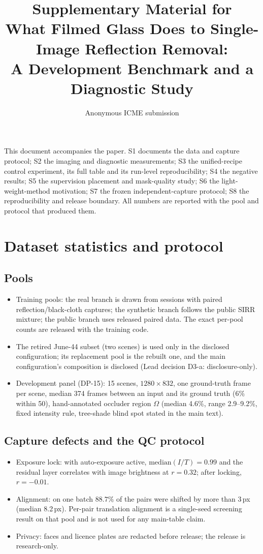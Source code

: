 \documentclass[10pt]{article}
\title{Supplementary Material for\\
What Filmed Glass Does to Single-Image Reflection Removal:\\
A Development Benchmark and a Diagnostic Study}
\author{Anonymous ICME submission}
\date{}
\newcommand{\Om}{\Omega}
\begin{document}
\maketitle

\noindent This document accompanies the paper. S1 documents the data and capture
protocol; S2 the imaging and diagnostic measurements; S3 the unified-recipe control
experiment, its full table and its run-level reproducibility; S4 the negative results;
S5 the supervision placement and mask-quality study; S6 the light-weight-method
motivation; S7 the frozen independent-capture protocol; S8 the reproducibility and
release boundary. All numbers are reported with the pool and protocol that produced
them.

\section{Dataset statistics and protocol}\label{supp:data}
\subsection{Pools}
\begin{itemize}
\item Training pools: the real branch is drawn from sessions with paired
  reflection/black-cloth captures; the synthetic branch follows the public SIRR
  mixture; the public branch uses released paired data. The exact per-pool counts are
  released with the training code.
\item The retired June-44 subset (two scenes) is used only in the disclosed
  configuration; its replacement pool is the rebuilt one, and the main configuration's
  composition is disclosed (Lead decision D3-a: disclosure-only).
\item Development panel (DP-15): 15 scenes, $1280{\times}832$, one ground-truth frame
  per scene, median 374 frames between an input and its ground truth (6\% within 50),
  hand-annotated occluder region $\Om$ (median 4.6\%, range 2.9--9.2\%, fixed
  intensity rule, tree-shade blind spot stated in the main text).
\end{itemize}
\subsection{Capture defects and the QC protocol}
\begin{itemize}
\item Exposure lock: with auto-exposure active, $\mathrm{median}(I/T)=0.99$ and the
  residual layer correlates with image brightness at $r=0.32$; after locking,
  $r=-0.01$.
\item Alignment: on one batch $88.7\%$ of the pairs were shifted by more than 3\,px
  (median 8.2\,px). Per-pair translation alignment is a single-seed screening result
  on that pool and is not used for any main-table claim.
\item Privacy: faces and licence plates are redacted before release; the release is
  research-only.
\end{itemize}
\end{document}
